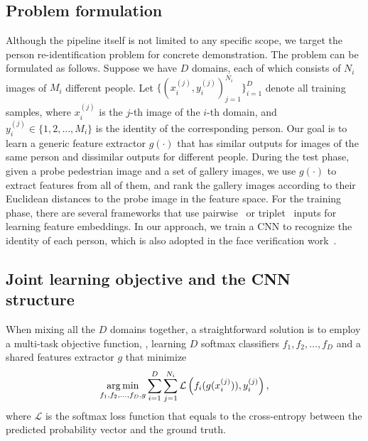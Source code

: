 \subsection{Problem formulation} %
\label{sub:md-problem-formulation}

Although the pipeline itself is not limited to any specific scope, we target the person re-identification problem for concrete demonstration. The problem can be formulated as follows. Suppose we have $D$ domains, each of which consists of $N_i$ images of $M_i$ different people. Let $\{(x_i^{(j)}, y_i^{(j)})_{j=1}^{N_i}\}_{i=1}^{D}$ denote all training samples, where $x_i^{(j)}$ is the $j$-th image of the $i$-th domain, and $y_i^{(j)} \in \{1,2,\dots,M_i\}$ is the identity of the corresponding person. Our goal is to learn a generic feature extractor $g(\cdot)$ that has similar outputs for images of the same person and dissimilar outputs for different people. During the test phase, given a probe pedestrian image and a set of gallery images, we use $g(\cdot)$ to extract features from all of them, and rank the gallery images according to their Euclidean distances to the probe image in the feature space. For the training phase, there are several frameworks that use pairwise~\cite{li2014deepreid,ahmed2015improved} or triplet~\cite{schroff2015facenet} inputs for learning feature embeddings. In our approach, we train a CNN to recognize the identity of each person, which is also adopted in the face verification work~\cite{sun2014deep1}.


\subsection{Joint learning objective and the CNN structure} %
\label{sub:md-joint-learning-and-cnn-structure}

When mixing all the $D$ domains together, a straightforward solution is to employ a multi-task objective function, \ie, learning $D$ softmax classifiers $f_1, f_2, \dots, f_D$ and a shared features extractor $g$ that minimize
\begin{equation} \label{eq:md-multi-task-objfunc}
    \mathop{\mathrm{arg\,min}}_{f_1,f_2,\dots,f_D,g} \sum_{i=1}^D \sum_{j=1}^{N_i} \mathcal{L}\left( f_i(g(x_i^{(j)})), y_i^{(j)} \right),
\end{equation}
where $\mathcal{L}$ is the softmax loss function that equals to the cross-entropy between the predicted probability vector and the ground truth.

